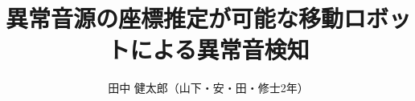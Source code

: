 \documentclass{/workdir/classes/minithesis2024j}
\begin{document}
\title{異常音源の座標推定が可能な移動ロボットによる異常音検知}
\author{田中 健太郎（山下・安・田・修士2年）}

\setlength{\baselineskip}{4.4mm}

\maketitle

\thispagestyle{empty}
\pagestyle{empty}









\end{document}
